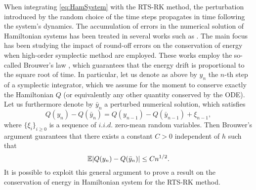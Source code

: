 \documentclass{siamart1116}
\numberwithin{theorem}{section}
\DeclarePairedDelimiter{\abs}{\lvert}{\rvert}
\newcommand{\E}{\operatorname{\mathbb{E}}}
\begin{document}
When integrating \eqref{eq:HamSystem} with the RTS-RK method, the perturbation introduced by the random choice of the time steps propagates in time following the system's dynamics. The accumulation of errors in the numerical solution of Hamiltonian systems has been treated in several works such as \cite{HMR08, Vil08b}. The main focus has been studying the impact of round-off errors on the conservation of energy when high-order symplectic method are employed. These works employ the so-called Brouwer's law \cite{Bro37}, which guarantees that the energy drift is proportional to the square root of time. In particular, let us denote as above by $y_n$ the $n$-th step of a symplectic integrator, which we assume for the moment to conserve exactly the Hamiltonian $Q$ (or equivalently any other quantity conserved by the ODE). Let us furthermore denote by $\bar y_n$ a perturbed numerical solution, which satisfies
\begin{equation}
	Q(y_n) - Q(\bar y_n) = Q(y_{n-1}) - Q(\bar y_{n-1}) + \xi_{n-1},
\end{equation}
where $\{\xi_i\}_{i\geq 0}$ is a sequence of $i.i.d.$ zero-mean random variables. Then Brouwer's argument guarantees that there exists a constant $C > 0$ independent of $h$ such that
\begin{equation}
	\E\abs{Q(y_n) - Q(\bar y_n)} \leq C n^{1/2}.
\end{equation}
It is possible to exploit this general argument to prove a result on the conservation of energy in Hamiltonian system for the RTS-RK method.
\end{document}
